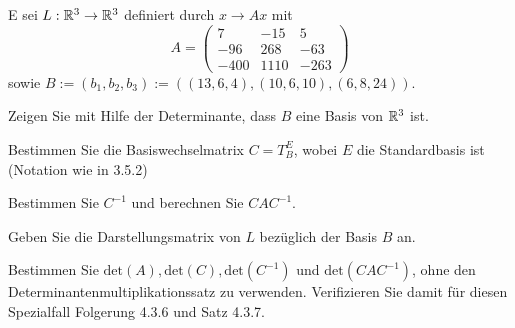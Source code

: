 \begin{Problem}
	E sei $L:\mathbb{R}^3\to \mathbb{R}^3$ definiert durch $x\to Ax$ mit
	\[
		A=\begin{pmatrix} 7 & -15 & 5 \\ -96 & 268 & -63 \\ -400 & 1110 & -263 \end{pmatrix} 
\]
sowie $B:=(b_1,b_2,b_3):=((13,6,4),(10,6,10),(6,8,24))$. 
\begin{parts}
\item Zeigen Sie mit Hilfe der Determinante, dass $B$ eine Basis von $\mathbb{R}^3$ ist.
\item Bestimmen Sie die Basiswechselmatrix $C=T_B^E$, wobei $E$ die Standardbasis ist (Notation wie in 3.5.2)
\item Bestimmen Sie $C^{-1}$ und berechnen Sie $CAC^{-1}$.
\item Geben Sie die Darstellungsmatrix von $L$ bezüglich der Basis $B$ an.
\item Bestimmen Sie $\text{det}(A),\text{det}(C),\text{det}(C^{-1})$ und $\text{det}(CAC^{-1})$, ohne den Determinantenmultiplikationssatz zu verwenden. Verifizieren Sie damit für diesen Spezialfall Folgerung 4.3.6 und Satz 4.3.7. 
\end{parts}
\end{Problem}

